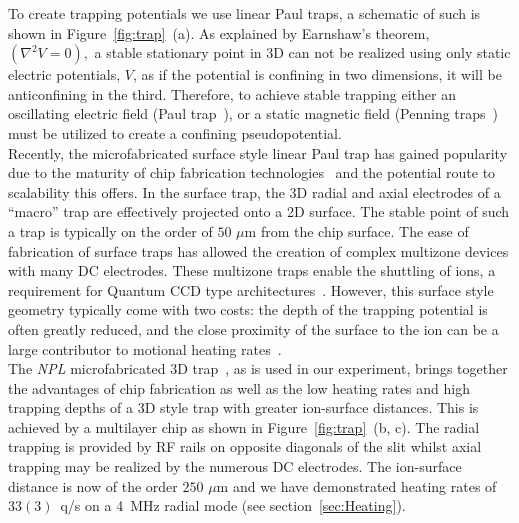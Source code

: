     To create trapping potentials we use linear Paul traps, a schematic of such
    is shown in Figure~\ref{fig:trap}~(a). As explained by Earnshaw's theorem,
    $(\nabla^2 V = 0),$ a stable stationary point in 3D can not be realized
    using only static electric potentials, $V$, as if the potential is confining
    in two dimensions, it will be anticonfining in the third. Therefore, to
    achieve stable trapping either an oscillating electric field (Paul
    trap~\cite{XXX}), or a static magnetic field (Penning traps~\cite{XXX}) must
    be utilized to create a confining pseudopotential.\\
    Recently, the microfabricated surface style linear Paul trap has gained
    popularity due to the maturity of chip fabrication
    technologies~\cite{allcock_surface-electrode_2011} and the potential route
    to scalability this offers. In the surface trap, the 3D radial and axial
    electrodes of a ``macro'' trap are effectively projected onto a 2D surface.
    The stable point of such a trap is typically on the order of $50$ $\mu$m
    from the chip surface. The ease of fabrication of surface traps has allowed
    the creation of complex multizone devices with many DC electrodes.  These
    multizone traps enable the shuttling of ions, a requirement for Quantum CCD
    type architectures~\cite{kielpinski_architecture_2002}. However, this
    surface style geometry typically come with two costs: the depth of the
    trapping potential is often greatly reduced, and the close proximity of the
    surface to the ion can be a large contributor to motional heating
    rates~\cite{turchette_heating_2000}. \\
    The \emph{NPL} microfabricated 3D trap~\cite{see_fabrication_2013,
    wilpers_monolithic_2012}, as is used in our experiment, brings together the
    advantages of chip fabrication as well as the low heating rates and high
    trapping depths of a 3D style trap with greater ion-surface distances. This
    is achieved by a multilayer chip as shown in Figure~\ref{fig:trap}~(b, c).
    The radial trapping is provided by RF rails on opposite diagonals of the
    slit whilst axial trapping may be realized by the numerous DC electrodes.
    The ion-surface distance is now of the order $250$ $\mu$m and we have
    demonstrated heating rates of $ 33(3)$~q/s on a 4~MHz radial mode (see
    section~\ref{sec:Heating}).

